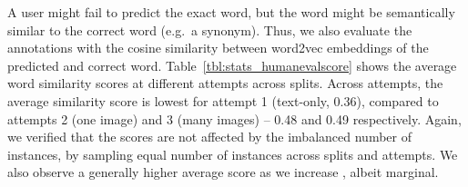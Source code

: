 \documentclass[twocolumn]{svjour3}          \smartqed  \usepackage{graphicx}
\begin{document}
\begin{comment}
\begin{table*}[t]
    \caption{Statistics of human evaluation of the fill-in-the-blank task (guess is correct if raw score ). (total counts are slightly higher because strict matching discards e.g. cases with 2 attempts but neither has score of 1)}
    \label{tbl:stats_humanevalinexact}
    \centering
    \begin{tabular}{cccccc}
    \toprule
    & \multicolumn{4}{c}{Correct at attempt} &
    \multirow{2}{*}{Total} \\
    \cline{2-5}
    & 1 & 2 & 3 & Failed & \\
    \midrule
 & 632 (19.33\%) & 671 (20.53\%) & 501 (15.33\%) & 1465 (44.81\%) & 3269\\
 & 555 (22.61\%) & 482 (19.63\%) & 384 (15.64\%) & 1034 (42.12\%) & 2455\\
 & 471 (22.71\%) & 415 (20.01\%) & 301 (14.51\%) & 887 (42.77\%) & 2074\\
 & 446 (25.23\%) & 395 (22.34\%) & 261 (14.76\%) & 666 (37.67\%) & 1768\\
 & 411 (25.70\%) & 344 (21.51\%) & 245 (15.32\%) & 599 (37.46\%) & 1599\\
\midrule
& 2515 (22.53\%) & 2307 (20.66\%) & 1692 (15.15\%) & 4651 (41.66\%) & 11165\\
    \bottomrule
    \end{tabular}
\end{table*}
\end{comment}
A user might fail to predict the exact word, but the word might be semantically similar to the correct word (e.g.\ a synonym). Thus, we also evaluate the annotations with the cosine similarity between word2vec embeddings of the predicted and correct word. Table~\ref{tbl:stats_humanevalscore} shows the average word similarity scores at different attempts across  splits. Across attempts, the average similarity score is lowest for attempt 1 (text-only, 0.36), compared to attempts 2 (one image) and 3 (many images) -- 0.48 and 0.49 respectively. Again, we verified that the scores are not affected by the imbalanced number of instances, by sampling equal number of instances across splits and attempts. We also observe a generally higher average score as we increase , albeit marginal.
\end{document}
